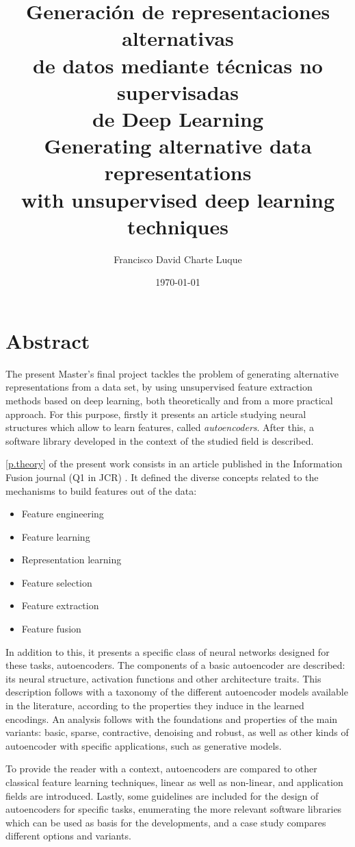 \documentclass[oneside,openright,titlepage,numbers=noenddot,openany,headinclude,footinclude=true,
cleardoublepage=empty,abstractoff,BCOR=5mm,paper=a4,fontsize=12pt,main=spanish]{scrreprt}
\author{Francisco David Charte Luque}
\date{\today}
\title{Generación de representaciones alternativas\\de datos mediante técnicas no supervisadas\\de Deep Learning\\\vspace{1em}Generating alternative data representations\\with unsupervised deep learning techniques}
\DeclareRobustCommand{\chaptertitle}[1]{\textls[80]{\scshape #1}}
\begin{document}
\maketitle
\tableofcontents

\clearpage

\chapter*{Abstract}
\addcontentsline{toc}{chapter}{\chaptertitle{abstract}}

The present Master's final project tackles the problem of generating alternative representations from a data set, by using unsupervised feature extraction methods based on deep learning, both theoretically and from a more practical approach. For this purpose, firstly it presents an article studying neural structures which allow to learn features, called \textit{autoencoders}.  After this, a software library developed in the context of the studied field is described.

\autoref{p.theory} of the present work consists in an article published in the Information Fusion journal (Q1 in JCR) \cite{charte2017}. It defined the diverse concepts related to the mechanisms to build features out of the data:
\begin{itemize}
\item Feature engineering
\item Feature learning
\item Representation learning
\item Feature selection
\item Feature extraction
\item Feature fusion
\end{itemize}

In addition to this, it presents a specific class of neural networks designed for these tasks, autoencoders. The components of a basic autoencoder are described: its neural structure, activation functions and other architecture traits. This description follows with a taxonomy of the different autoencoder models available in the literature, according to the properties they induce in the learned encodings. An analysis follows with the foundations and properties of the main variants: basic, sparse, contractive, denoising and robust, as well as other kinds of autoencoder with specific applications, such as generative models.

To provide the reader with a context, autoencoders are compared to other classical feature learning techniques, linear as well as non-linear, and application fields are introduced. Lastly, some guidelines are included for the design of autoencoders for specific tasks, enumerating the more relevant software libraries which can be used as basis for the developments, and a case study compares different options and variants.
\end{document}
